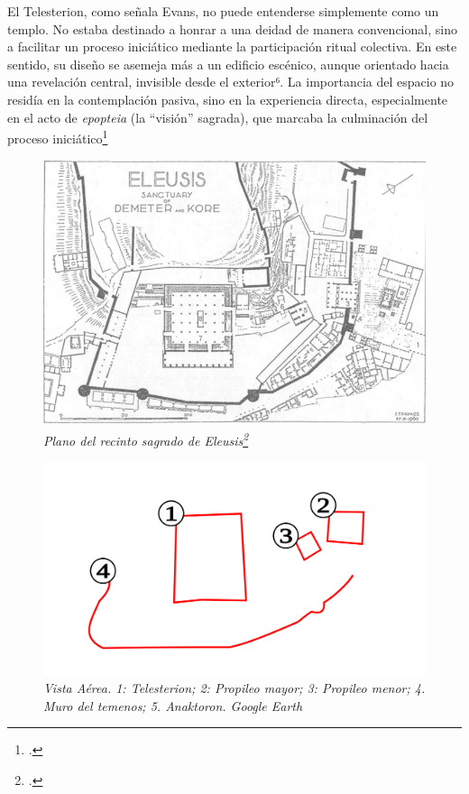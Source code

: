El Telesterion, como señala Evans, no puede entenderse simplemente como un templo. No estaba destinado a honrar a una deidad de manera convencional, sino a facilitar un proceso iniciático mediante la participación ritual colectiva. En este sentido, su diseño se asemeja más a un edificio escénico, aunque orientado hacia una revelación central, invisible desde el exterior⁶. La importancia del espacio no residía en la contemplación pasiva, sino en la experiencia directa, especialmente en el acto de \textit{epopteia }(la “visión” sagrada), que marcaba la culminación del proceso iniciático\footcite[245-246]{a.evansSanctuariesSacrificesEleusinian2002}


\begin{figure}[h!]
	\centering
	\includegraphics[width=0.6\linewidth]{Imagenes/PlanoSantuarioEleusis}
	\caption{\textit{\textit{Plano del recinto sagrado de Eleusis\footcite[231]{a.evansSanctuariesSacrificesEleusinian2002}}}}
	\label{fig:santuario de eleusis}
\end{figure}

\begin{figure}[h!]
	\centering
	\includegraphics[width=0.6\linewidth]{Imagenes/VistaAereaEleusis}
	\caption{\textit{Vista Aérea. 1: Telesterion; 2: Propileo mayor; 3: Propileo menor; 4. Muro del temenos; 5. Anaktoron. Google Earth}}
	\label{fig:vista aérea del santuario de eleusis}
\end{figure}





